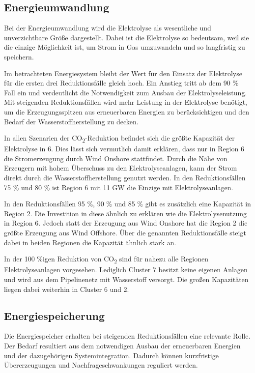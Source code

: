 \subsection{Energieumwandlung}
Bei der Energieumwandlung wird die Elektrolyse als wesentliche und unverzichtbare Größe dargestellt. Dabei ist die Elektrolyse so bedeutsam, weil sie die einzige Möglichkeit ist, um Strom in Gas umzuwandeln und so langfristig zu speichern.

Im betrachteten Energiesystem bleibt der Wert für den Einsatz der Elektrolyse für die ersten drei Reduktionsfälle gleich hoch. Ein Anstieg tritt ab dem 90 \% Fall ein und verdeutlicht die Notwendigkeit zum Ausbau der Elektrolyseleistung. Mit steigenden Reduktionsfällen wird mehr Leistung in der Elektrolyse benötigt, um die Erzeugungsspitzen aus erneuerbaren Energien zu berücksichtigen und den Bedarf der Wasserstoffherstellung zu decken. 


In allen Szenarien der CO\textsubscript{2}-Reduktion befindet sich die größte Kapazität der Elektrolyse in 6. Dies lässt sich vermutlich damit erklären, dass nur in Region 6 die Stromerzeugung durch Wind Onshore stattfindet. Durch die Nähe von Erzeugern mit hohem Überschuss zu den Elektrolyseanlagen, kann der Strom direkt durch die Wasserstoffherstellung genutzt werden. In den Reduktionsfällen 75 \% und 80 \% ist Region 6 mit 11 GW die Einzige mit Elektrolyseanlagen.

In den Reduktionsfällen 95 \%, 90 \% und 85 \% gibt es zusätzlich eine Kapazität in Region 2. Die Investition in diese ähnlich zu erklären wie die Elektrolysenutzung in Region 6. Jedoch statt der Erzeugung aus Wind Onshore hat die Region 2 die größte Erzeugung aus Wind Offshore.
Über die genannten Reduktionsfälle steigt dabei in beiden Regionen die Kapazität ähnlich stark an. 

In der 100 \%igen Reduktion von CO\textsubscript{2} sind für nahezu alle Regionen Elektrolyseanlagen vorgesehen. Lediglich Cluster 7 besitzt keine eigenen Anlagen und wird aus dem Pipelinenetz mit Wasserstoff versorgt. Die großen Kapazitäten liegen dabei weiterhin in Cluster 6 und 2.

\subsection{Energiespeicherung}
Die Energiespeicher erhalten bei steigenden Reduktionsfällen eine relevante Rolle. Der Bedarf resultiert aus dem notwendigen Ausbau der erneuerbaren Energien und der dazugehörigen Systemintegration. 
Dadurch können kurzfristige Übererzeugungen und Nachfrageschwankungen reguliert werden. 

